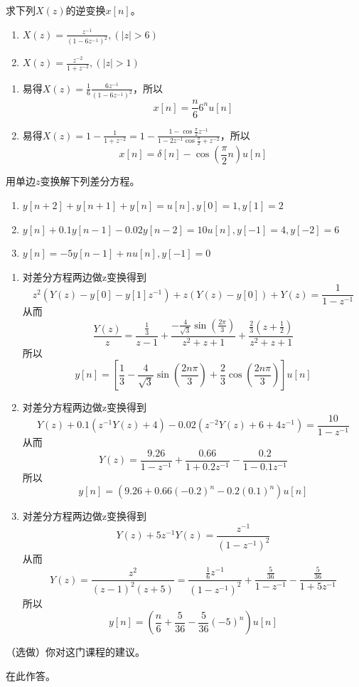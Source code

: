 \documentclass[answers]{exam}  %
\begin{document}
\begin{questions}
\question 求下列$X(z)$的逆变换$x[n]$。
\begin{enumerate}[(1)]
\item $X(z)=\frac{z^{-1}}{(1-6z^{-1})^2},(|z|>6)$
\item $X(z)=\frac{z^{-2}}{1+z^{-2}},(|z|>1)$
\end{enumerate}
\begin{solution}
\begin{enumerate}[(1)]
	\item 易得$X(z)=\frac{1}{6}\frac{6z^{-1}}{(1-6z^{-1})^2}$，所以$$x[n]=\frac{n}{6}6^nu[n]$$
	\item 易得$X(z)=1-\frac{1}{1+z^{-2}}=1-\frac{1-\cos\frac{\pi}{2}z^{-1}}{1-2z^{-1}\cos\frac{\pi}{2}+z^{-2}}$，所以$$x[n]=\delta[n]-\cos(\frac{\pi}{2}n)u[n]$$
\end{enumerate}
\end{solution}

\question 用单边$z$变换解下列差分方程。
\begin{enumerate}[(1)]
\item $y[n+2]+y[n+1]+y[n]=u[n],y[0]=1,y[1]=2$
\item $y[n]+0.1y[n-1]-0.02y[n-2]=10u[n],y[-1]=4,y[-2]=6$
\item $y[n]=-5y[n-1]+nu[n],y[-1]=0$
\end{enumerate}
\begin{solution}
\begin{enumerate}[(1)]
	\item 对差分方程两边做z变换得到$$z^2(Y(z)-y[0]-y[1]z^{-1})+z(Y(z)-y[0])+Y(z)=\frac{1}{1-z^{-1}}$$从而$$\frac{Y(z)}{z}=\frac{\frac{1}{3}}{z-1}+\frac{-\frac{4}{\sqrt{3}}\sin(\frac{2\pi}{3})}{z^2+z+1}+\frac{\frac{2}{3}(z+\frac{1}{2})}{z^2+z+1}$$
	所以$$y[n]=[\frac{1}{3}-\frac{4}{\sqrt{3}}\sin(\frac{2n\pi}{3})+\frac{2}{3}\cos(\frac{2n\pi}{3})]u[n]$$
	\item 对差分方程两边做z变换得到$$Y(z)+0.1(z^{-1}Y(z)+4)-0.02(z^{-2}Y(z)+6+4z^{-1})=\frac{10}{1-z^{-1}}$$从而$$Y(z)=\frac{9.26}{1-z^{-1}}+\frac{0.66}{1+0.2z^{-1}}-\frac{0.2}{1-0.1z^{-1}}$$所以$$y[n]=(9.26+0.66(-0.2)^n-0.2(0.1)^n)u[n]$$
	\item 对差分方程两边做z变换得到$$Y(z)+5z^{-1}Y(z)=\frac{z^{-1}}{(1-z^{-1})^2}$$从而$$Y(z)=\frac{z^{2}}{(z-1)^2(z+5)}=\frac{\frac{1}{6}z^{-1}}{(1-z^{-1})^2}+\frac{\frac{5}{36}}{1-z^{-1}}-\frac{\frac{5}{36}}{1+5z^{-1}}$$所以$$y[n]=(\frac{n}{6}+\frac{5}{36}-\frac{5}{36}(-5)^n)u[n]$$
\end{enumerate}
\end{solution}

\question （选做）你对这门课程的建议。
\begin{solution}
	在此作答。
\end{solution}


\end{questions}
\end{document}
